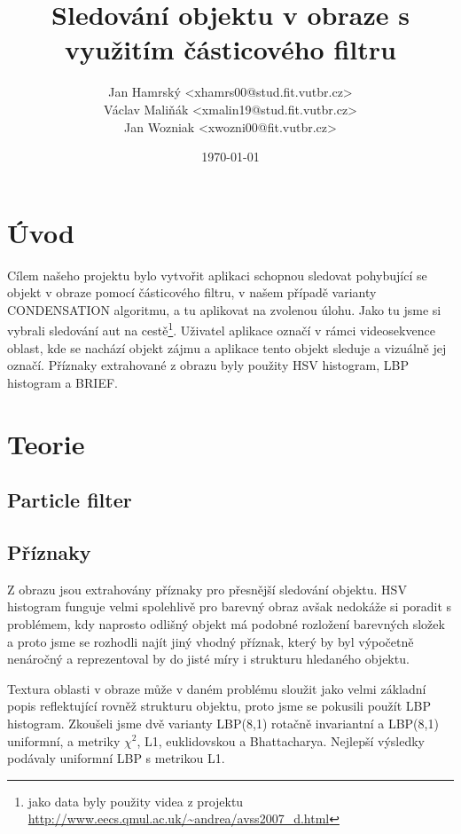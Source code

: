 \documentclass[12pt]{article}
\title{Sledování objektu v obraze s využitím částicového filtru}
\author{Jan Hamrský <xhamrs00@stud.fit.vutbr.cz> \\
        Václav Maliňák <xmalin19@stud.fit.vutbr.cz> \\
        Jan Wozniak <xwozni00@fit.vutbr.cz>}
\date{\today}
\begin{document}
\maketitle

\section{Úvod}

Cílem našeho projektu bylo vytvořit aplikaci schopnou sledovat pohybující se objekt v obraze pomocí částicového filtru, v našem případě varianty CONDENSATION algoritmu, a tu aplikovat na zvolenou
úlohu. Jako tu jsme si vybrali sledování aut na cestě\footnote{jako data byly použity videa z projektu \url{http://www.eecs.qmul.ac.uk/~andrea/avss2007\_d.html}}. Uživatel aplikace označí v rámci videosekvence oblast, kde se nachází objekt zájmu a aplikace tento objekt sleduje a vizuálně jej označí. Příznaky extrahované z obrazu byly použity HSV histogram, LBP histogram a BRIEF.


\section{Teorie}

\subsection*{Particle filter}


\subsection*{Příznaky}
Z obrazu jsou extrahovány příznaky pro přesnější sledování objektu. HSV histogram funguje velmi spolehlivě pro barevný obraz avšak nedokáže si poradit s problémem, kdy naprosto odlišný objekt má  podobné rozložení barevných složek a proto jsme se rozhodli najít jiný vhodný příznak, který by byl výpočetně nenáročný a reprezentoval by do jisté míry i strukturu hledaného objektu. 

Textura oblasti v obraze může v daném problému sloužit jako velmi základní popis reflektující rovněž strukturu objektu, proto jsme se pokusili použít LBP histogram\cite{lbp}. Zkoušeli jsme dvě varianty LBP(8,1) rotačně invariantní a LBP(8,1) uniformní, a metriky $\chi^2$, L1, euklidovskou a Bhattacharya. Nejlepší výsledky podávaly uniformní LBP s metrikou L1.
\end{document}

